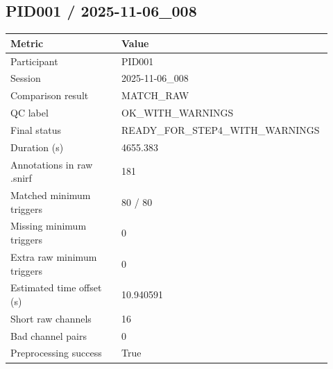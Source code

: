 \subsection*{PID001 / 2025-11-06\_008}
\begin{tabular}{p{0.34\linewidth}p{0.58\linewidth}}
\toprule
Metric & Value\\
\midrule
Participant & PID001\\
Session & 2025-11-06\_008\\
Comparison result & MATCH\_RAW\\
QC label & OK\_WITH\_WARNINGS\\
Final status & READY\_FOR\_STEP4\_WITH\_WARNINGS\\
Duration (s) & 4655.383\\
Annotations in raw .snirf & 181\\
Matched minimum triggers & 80 / 80\\
Missing minimum triggers & 0\\
Extra raw minimum triggers & 0\\
Estimated time offset (s) & 10.940591\\
Short raw channels & 16\\
Bad channel pairs & 0\\
Preprocessing success & True\\
\bottomrule
\end{tabular}
